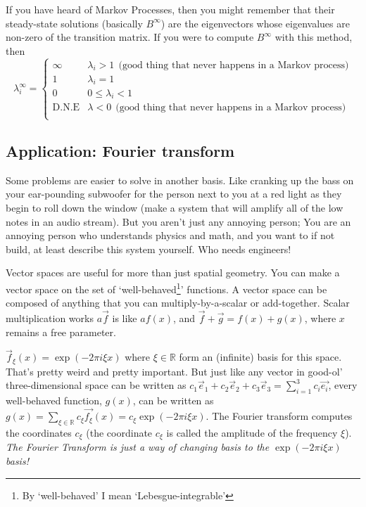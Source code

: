 \documentclass[12pt,letterpaper,oneside]{article}
\begin{document}
If you have heard of Markov Processes, then you might remember that their steady-state solutions (basically $B^\infty$) are the eigenvectors whose eigenvalues are non-zero of the transition matrix. If you were to compute $B^\infty$ with this method, then $$\lambda_i^\infty = \begin{cases}
  \infty & \lambda_i > 1~~ \text{(good thing that never happens in a Markov process)} \\
  1 & \lambda_i = 1 \\
  0 &  0 \leq \lambda_i < 1 \\
  \mathrm{D.N.E} & \lambda < 0 ~~\text{(good thing that never happens in a Markov process)} \\
\end{cases}
$$

\subsection{Application: Fourier transform}

Some problems are easier to solve in another basis. Like cranking up the bass on your ear-pounding subwoofer for the person next to you at a red light as they begin to roll down the window (make a system that will amplify all of the low notes in an audio stream). But you aren't just any annoying person; You are an annoying person who understands physics and math, and you want to if not build, at least describe this system yourself. Who needs engineers!

Vector spaces are useful for more than just spatial geometry. You can make a vector space on the set of `well-behaved\footnote{By `well-behaved' I mean `Lebesgue-integrable'}' functions. A vector space can be composed of anything that you can multiply-by-a-scalar or add-together. Scalar multiplication works $a \vec{f}$ is like $a f(x)$, and $\vec{f} + \vec{g} = f(x) + g(x)$, where $x$ remains a free parameter.

$\vec{f}_\xi(x) = \exp(-2 \pi i \xi x)$ where $\xi \in \mathbb{R}$ form an (infinite) basis for this space. That's pretty weird and pretty important. But just like any vector in good-ol' three-dimensional space can be written as $c_1 \vec{e}_1 + c_2 \vec{e}_2 + c_3 \vec{e}_3 = \sum_{i=1}^3 c_i \vec{e_i}$, every well-behaved function, $g(x)$, can be written as $g(x) = \sum_{\xi \in \mathbb{R}} c_\xi \vec{f_\xi}(x) = c_\xi \exp(-2 \pi i \xi x)$. The Fourier transform computes the coordinates $c_\xi$ (the coordinate $c_\xi$ is called the amplitude of the frequency $\xi$). \textit{The Fourier Transform is just a way of changing basis to the $\exp(-2 \pi i \xi x)$ basis!}
\end{document}
